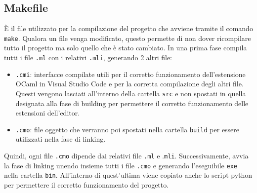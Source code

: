 \documentclass[11pt]{article}
\providecommand{\tightlist}{%
      \setlength{\itemsep}{0pt}\setlength{\parskip}{0pt}}
\begin{document}
    \hypertarget{makefile}{%
\subsection{\texorpdfstring{Makefile }{Makefile }}\label{makefile}}

    È il file utilizzato per la compilazione del progetto che avviene
tramite il comando \texttt{make}. Qualora un file venga modificato,
questo permette di non dover ricompilare tutto il progetto ma solo
quello che è stato cambiato. In una prima fase compila tutti i file
\texttt{.ml} con i relativi \texttt{.mli}, generando 2 altri file:

\begin{itemize}
\tightlist
\item
  \texttt{.cmi}: interfacce compilate utili per il corretto
  funzionamento dell'estensione OCaml in Visual Studio Code e per la
  corretta compilazione degli altri file. Questi vengono lasciati
  all'interno della cartella \texttt{src} e non spostati in quella
  designata alla fase di building per permettere il corretto
  funzionamento delle estensioni dell'editor.
\item
  \texttt{.cmo}: file oggetto che verranno poi spostati nella cartella
  \texttt{build} per essere utilizzati nella fase di linking.
\end{itemize}

Quindi, ogni file \texttt{.cmo} dipende dai relativi file \texttt{.ml} e
.\texttt{mli}. Successivamente, avvia la fase di linking unendo insieme
tutti i file \texttt{.cmo} e generando l'eseguibile \texttt{exe} nella
cartella \texttt{bin}. All'interno di quest'ultima viene copiato anche
lo script python per permettere il corretto funzionamento del progetto.
\end{document}
